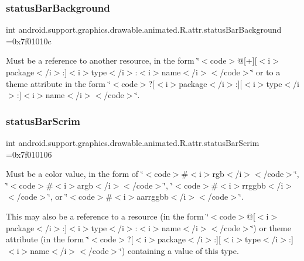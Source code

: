 \subsubsection{\texorpdfstring{status\+Bar\+Background}{statusBarBackground}}
{\footnotesize\ttfamily int android.\+support.\+graphics.\+drawable.\+animated.\+R.\+attr.\+status\+Bar\+Background =0x7f01010c\hspace{0.3cm}{\ttfamily [static]}}

Must be a reference to another resource, in the form \char`\"{}$<$code$>$@\mbox{[}+\mbox{]}\mbox{[}$<$i$>$package$<$/i$>$\+:\mbox{]}$<$i$>$type$<$/i$>$\+:$<$i$>$name$<$/i$>$$<$/code$>$\char`\"{} or to a theme attribute in the form \char`\"{}$<$code$>$?\mbox{[}$<$i$>$package$<$/i$>$\+:\mbox{]}\mbox{[}$<$i$>$type$<$/i$>$\+:\mbox{]}$<$i$>$name$<$/i$>$$<$/code$>$\char`\"{}. \mbox{\label{classandroid_1_1support_1_1graphics_1_1drawable_1_1animated_1_1R_1_1attr_a68fae95d60e6bda6c6fc4b412c23ce0c}} 
\subsubsection{\texorpdfstring{status\+Bar\+Scrim}{statusBarScrim}}
{\footnotesize\ttfamily int android.\+support.\+graphics.\+drawable.\+animated.\+R.\+attr.\+status\+Bar\+Scrim =0x7f010106\hspace{0.3cm}{\ttfamily [static]}}

Must be a color value, in the form of \char`\"{}$<$code$>$\#$<$i$>$rgb$<$/i$>$$<$/code$>$\char`\"{}, \char`\"{}$<$code$>$\#$<$i$>$argb$<$/i$>$$<$/code$>$\char`\"{}, \char`\"{}$<$code$>$\#$<$i$>$rrggbb$<$/i$>$$<$/code$>$\char`\"{}, or \char`\"{}$<$code$>$\#$<$i$>$aarrggbb$<$/i$>$$<$/code$>$\char`\"{}. 

This may also be a reference to a resource (in the form \char`\"{}$<$code$>$@\mbox{[}$<$i$>$package$<$/i$>$\+:\mbox{]}$<$i$>$type$<$/i$>$\+:$<$i$>$name$<$/i$>$$<$/code$>$\char`\"{}) or theme attribute (in the form \char`\"{}$<$code$>$?\mbox{[}$<$i$>$package$<$/i$>$\+:\mbox{]}\mbox{[}$<$i$>$type$<$/i$>$\+:\mbox{]}$<$i$>$name$<$/i$>$$<$/code$>$\char`\"{}) containing a value of this type. \mbox{\label{classandroid_1_1support_1_1graphics_1_1drawable_1_1animated_1_1R_1_1attr_a9eeb8a2a8065d810833081c713ddc204}} 

